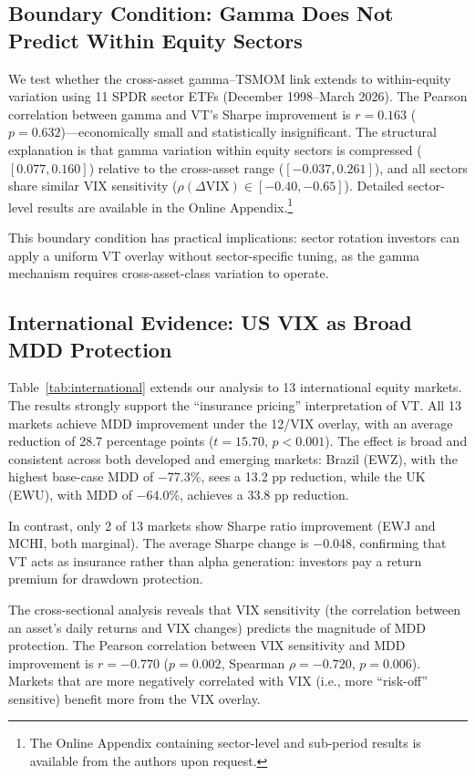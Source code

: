 \subsection{Boundary Condition: Gamma Does Not Predict Within Equity Sectors}

We test whether the cross-asset gamma--TSMOM link extends to within-equity variation using 11 SPDR sector ETFs (December 1998--March 2026). The Pearson correlation between gamma and VT's Sharpe improvement is $r = 0.163$ ($p = 0.632$)---economically small and statistically insignificant. The structural explanation is that gamma variation within equity sectors is compressed ($[0.077, 0.160]$) relative to the cross-asset range ($[-0.037, 0.261]$), and all sectors share similar VIX sensitivity ($\rho(\Delta\text{VIX}) \in [-0.40, -0.65]$). Detailed sector-level results are available in the Online Appendix.\footnote{The Online Appendix containing sector-level and sub-period results is available from the authors upon request.}

This boundary condition has practical implications: sector rotation investors can apply a uniform VT overlay without sector-specific tuning, as the gamma mechanism requires cross-asset-class variation to operate.


\subsection{International Evidence: US VIX as Broad MDD Protection}

Table~\ref{tab:international} extends our analysis to 13 international equity markets. The results strongly support the ``insurance pricing'' interpretation of VT. All 13 markets achieve MDD improvement under the 12/VIX overlay, with an average reduction of 28.7 percentage points ($t = 15.70$, $p < 0.001$). The effect is broad and consistent across both developed and emerging markets: Brazil (EWZ), with the highest base-case MDD of $-$77.3\%, sees a 13.2 pp reduction, while the UK (EWU), with MDD of $-$64.0\%, achieves a 33.8 pp reduction.

In contrast, only 2 of 13 markets show Sharpe ratio improvement (EWJ and MCHI, both marginal). The average Sharpe change is $-$0.048, confirming that VT acts as insurance rather than alpha generation: investors pay a return premium for drawdown protection.

The cross-sectional analysis reveals that VIX sensitivity (the correlation between an asset's daily returns and VIX changes) predicts the magnitude of MDD protection. The Pearson correlation between VIX sensitivity and MDD improvement is $r = -0.770$ ($p = 0.002$, Spearman $\rho = -0.720$, $p = 0.006$). Markets that are more negatively correlated with VIX (i.e., more ``risk-off'' sensitive) benefit more from the VIX overlay.

